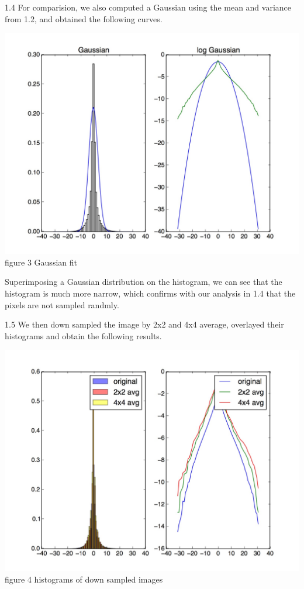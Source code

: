 \documentclass[12pt]{article}
\newenvironment{problem}[2][Problem]{\begin{trivlist}
\item[\hskip \labelsep {\bfseries #1}\hskip \labelsep {\bfseries #2}]}{\end{trivlist}}
\begin{document}
\begin{problem}{1. High Kurtosis and Scale Invariance}
\item{1.4}
For comparision, we also computed a Gaussian using the mean and variance from 1.2, and obtained the following curves.
\begin{center}
		\includegraphics[height=10cm]{results/q1_4.jpg}{\\figure 3 Gaussian fit}
\end{center}
Superimposing a Gaussian distribution on the histogram, we can see that the histogram is much more narrow, which confirms with our analysis in 1.4 that the pixels are not sampled randmly.\\
\item{1.5}
We then down sampled the image by 2x2 and 4x4 average, overlayed their histograms and obtain the following results.
\begin{center}
		\includegraphics[height=10cm]{results/q1_5.jpg}{\\figure 4 histograms of down sampled images}

\end{center}
\end{problem}
\end{document}
